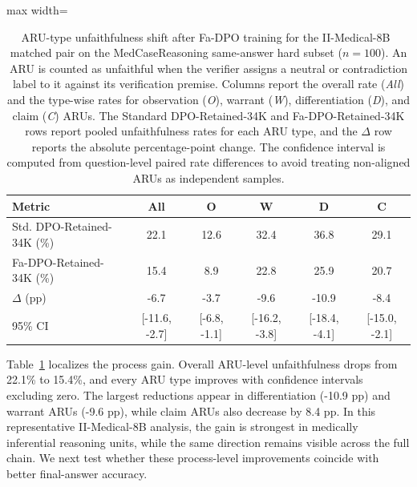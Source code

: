 \documentclass[a4paper,fleqn,doubleblind]{cas-sc}
\begin{document}
\begin{table}[htbp]
    \centering
    \footnotesize
    \caption[ARU-type unfaithfulness shift after Fa-DPO training.]{ARU-type unfaithfulness shift after Fa-DPO training for the II-Medical-8B~\cite{intelligentinternet2025iimedical8b} matched pair on the MedCaseReasoning same-answer hard subset ($n=100$). An ARU is counted as unfaithful when the verifier assigns a neutral or contradiction label to it against its verification premise. Columns report the overall rate (\textit{All}) and the type-wise rates for observation (\textit{O}), warrant (\textit{W}), differentiation (\textit{D}), and claim (\textit{C}) ARUs. The Standard DPO-Retained-34K and Fa-DPO-Retained-34K rows report pooled unfaithfulness rates for each ARU type, and the $\Delta$ row reports the absolute percentage-point change. The confidence interval is computed from question-level paired rate differences to avoid treating non-aligned ARUs as independent samples.}
    \label{tab:iimedical_aru_shift}
    \begin{adjustbox}{max width=\columnwidth}
    \begin{tabular}{lccccc}
        \toprule
        \textbf{Metric} & \textbf{All} & \textbf{O} & \textbf{W} & \textbf{D} & \textbf{C} \\
        \midrule
        Std. DPO-Retained-34K (\%) & 22.1 & 12.6 & 32.4 & 36.8 & 29.1 \\
        Fa-DPO-Retained-34K (\%) & 15.4 & 8.9 & 22.8 & 25.9 & 20.7 \\
        $\Delta$ (pp) & -6.7 & -3.7 & -9.6 & -10.9 & -8.4 \\
        95\% CI & [-11.6, -2.7] & [-6.8, -1.1] & [-16.2, -3.8] & [-18.4, -4.1] & [-15.0, -2.1] \\
        \bottomrule
    \end{tabular}
    \end{adjustbox}
\end{table}

Table~\ref{tab:iimedical_aru_shift} localizes the process gain. Overall ARU-level unfaithfulness drops from 22.1\% to 15.4\%, and every ARU type improves with confidence intervals excluding zero. The largest reductions appear in differentiation (-10.9 pp) and warrant ARUs (-9.6 pp), while claim ARUs also decrease by 8.4 pp. In this representative II-Medical-8B analysis, the gain is strongest in medically inferential reasoning units, while the same direction remains visible across the full chain. We next test whether these process-level improvements coincide with better final-answer accuracy.
\end{document}
